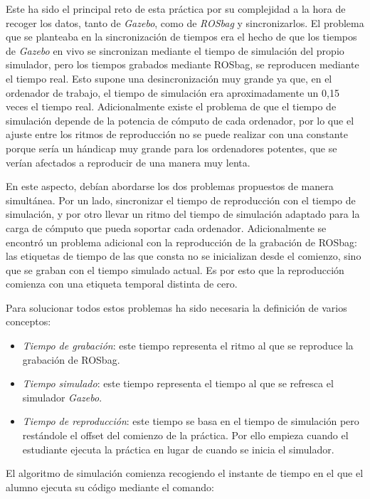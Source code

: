 Este ha sido el principal reto de esta práctica por su complejidad a la hora de recoger los datos, tanto de \textit{Gazebo}, como de \textit{ROSbag} y sincronizarlos. El problema que se planteaba en la sincronización de tiempos era el hecho de que los tiempos de \textit{Gazebo} en vivo se sincronizan mediante el tiempo de simulación del propio simulador, pero los tiempos grabados mediante ROSbag, se reproducen mediante el tiempo real. Esto supone una desincronización muy grande ya que, en el ordenador de trabajo, el tiempo de simulación era aproximadamente un 0,15 veces el tiempo real. Adicionalmente existe el problema de que el tiempo de simulación depende de la potencia de cómputo de cada ordenador, por lo que el ajuste entre los ritmos de reproducción no se puede realizar con una constante porque sería un hándicap muy grande para los ordenadores potentes, que se verían afectados a reproducir de una manera muy lenta.

En este aspecto, debían abordarse los dos problemas propuestos de manera simultánea. Por un lado, sincronizar el tiempo de reproducción con el tiempo de simulación, y por otro llevar un ritmo del tiempo de simulación adaptado para la carga de cómputo que pueda soportar cada ordenador. Adicionalmente se encontró un problema adicional con la reproducción de la grabación de ROSbag: las etiquetas de tiempo de las que consta no se inicializan desde el comienzo, sino que se graban con el tiempo simulado actual. Es por esto que la reproducción comienza con una etiqueta temporal distinta de cero.

Para solucionar todos estos problemas ha sido necesaria la definición de varios conceptos:

\begin{itemize}
	\item \textit{Tiempo de grabación}: este tiempo representa el ritmo al que se reproduce la grabación de ROSbag.
	\item \textit{Tiempo simulado}: este tiempo representa el tiempo al que se refresca el simulador \textit{Gazebo}.
	\item \textit{Tiempo de reproducción}: este tiempo se basa en el tiempo de simulación pero restándole el offset del comienzo de la práctica. Por ello empieza cuando el estudiante ejecuta la práctica en lugar de cuando se inicia el simulador.
\end{itemize}

El algoritmo de simulación comienza recogiendo el instante de tiempo en el que el alumno ejecuta su código mediante el comando:

